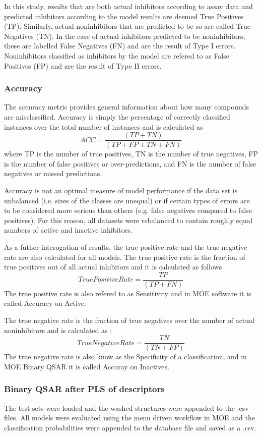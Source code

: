 In this study, results that are both actual inhibitors according to assay data and predicted inhibitors according to the model results are deemed True Positives (TP). Similarly, actual noninhibitors that are predicted to be so are called True Negatives (TN). In the case of actual inhibitors predicted to be noninhibitors, these are labelled False Negatives (FN) and are the result of Type I errors. Noninhibitors classified as inhibitors by the model are refered to as False Positives (FP) and are the result of Type II errors.

\subsubsection{Accuracy}

The accuracy metric provides general information about how many compounds are misclassified. Accuracy is simply the percentage of correctly classified instances over the total number of instances and is calculated as
$$ ACC =\frac{(TP + TN)}{(TP + FP + TN + FN)} $$
where TP is the number of true positives, TN is the number of true negatives, FP is the number of false positives or over-predictions, and FN is the number of false negatives or missed predictions.

Accuracy is not an optimal measure of model performance if the data set is unbalanced (i.e. sizes of the classes are unequal) or if certain types of errors are to be considered more serious than others (e.g. false negatives compared to false positives). \cite{Lapins2013} For this reason, all datasets were rebalanced to contain roughly equal numbers of active and inactive inhibitors.

As a futher interogation of results, the true positive rate and the true negative rate are also calculated for all models. The true positive rate is the fraction of true positives out of all actual inhibitors and it is calculated as follows 
$$ True Positive Rate = \frac{TP}{(TP + FN)} $$
The true positive rate is also refered to as Sensitivity and in MOE software it is called Accuracy on Active.

The true negative rate is the fraction of true negatives over the number of actual noninhibitors and is calculated as :
$$ True Negative Rate =\frac{ TN }{(TN + FP)} $$
The true negative rate is also know as the Specificity of a classification, and in MOE Binary QSAR it is called Accuray on Inactives.

\subsubsection{Binary QSAR after PLS of descriptors}
The test sets were loaded and the washed structures were appended to the .csv files. All models were evaluated using the menu driven workflow in MOE and the classification probabilities were appended to the database file and saved as a .csv.  


